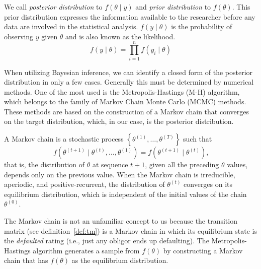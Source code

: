 \documentclass[11pt,fleqn]{book} %
\begin{document}
We call \emph{posterior distribution} to $f(\theta \mid y)$ and 
\emph{prior distribution} to $f(\theta)$. This prior distribution 
expresses the information available to the researcher before 
any data are involved in the statistical analysis. $f(y \mid \theta)$ 
is the probability of observing $y$ given $\theta$ and is also 
known as the likelihood.
\begin{displaymath}
	f(y \mid \theta) = \prod_{i=1}^n f(y_i \mid \theta)
\end{displaymath}

When utilizing Bayesian inference, we can identify a closed form of the 
posterior distribution in only a few cases. Generally this must be determined 
by numerical methods. One of the most used is the Metropolis-Hastings (M-H)
algorithm, which belongs to the family of Markov Chain Monte Carlo (MCMC) 
methods. These methods are based on the construction of a Markov chain that 
converges on the target distribution, which, in our case, is the posterior 
distribution.

\begin{definition}
	A Markov chain is a stochastic process 
	$\left\{\theta^{(1)},\dots,\theta^{(T)}\right\}$ such that
	\begin{displaymath}
		f\left(\theta^{(t+1)} \mid \theta^{(t)},\dots,\theta^{(1)}\right) = 
		f\left(\theta^{(t+1)} \mid \theta^{(t)}\right)
		\text{,}
	\end{displaymath}
	that is, the distribution of $\theta$ at sequence $t+1$, given all the 
	preceding $\theta$ values, depends only on the previous value. 
	When the Markov chain is irreducible, aperiodic, and positive-recurrent, 
	the distribution of $\theta^{(t)}$ converges on its equilibrium 
	distribution, which is independent of the initial values of the chain 
	$\theta^{(0)}$.
\end{definition}

The Markov chain is not an unfamiliar concept to us because the transition 
matrix (see definition~\ref{def:tm}) is a Markov chain in which its 
equilibrium state is the \emph{defaulted} rating (i.e., just any 
obligor ends up defaulting).
The Metropolis-Hastings algorithm generates a sample from $f(\theta)$ 
by constructing a Markov chain that has $f(\theta)$ as the equilibrium 
distribution.
\end{document}
